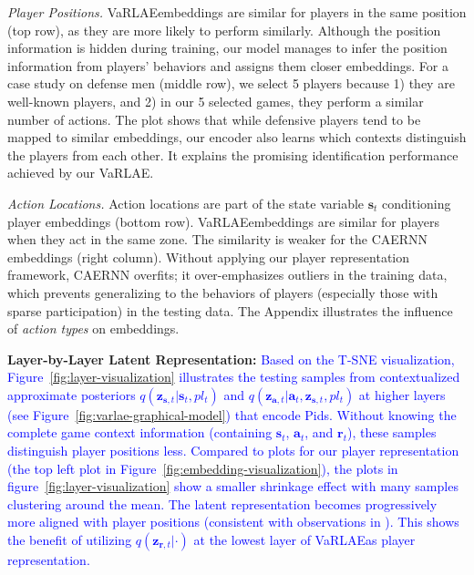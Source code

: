 \documentclass[letterpaper]{article} %
\newcommand{\latentvariables}{\mathbf{z}}
\newcommand{\state}{\mathbf{s}}
\newcommand{\action}{\mathbf{a}}
\newcommand{\reward}{\boldsymbol{r}}
\newcommand{\player}{pl}
\newcommand{\system}{VaRLAE\;}
\begin{document}
{\em Player Positions.} 
\system embeddings are similar for
players in the same position (top row), as they are more likely to perform similarly. Although the position information is hidden during training, our model manages to infer the position information from players' behaviors and assigns them closer embeddings.
For a case study on  defense men (middle row), we select 5 players because 1) they are well-known players, and 2) in our 5 selected games, they perform a similar number of actions.
The plot shows that while defensive players tend to be mapped to similar embeddings, our encoder also learns which contexts distinguish the players from each other. It explains the promising identification performance achieved by our \system.

{\em Action Locations.} 
Action locations are part of the state variable $\state_{t}$ conditioning player embeddings (bottom row). 
\system embeddings are similar for players when they act in the same zone. 
The similarity is 
weaker for the CAERNN embeddings (right column). Without 
applying our player representation framework, CAERNN overfits;
it over-emphasizes %
outliers in the training data, which prevents generalizing to the behaviors of players (especially those with sparse participation) in the testing data.   
The Appendix illustrates the influence of {\em action types} on embeddings.

{\bf Layer-by-Layer Latent Representation:}
\textcolor{blue}{Based on the T-SNE visualization, Figure~\ref{fig:layer-visualization} illustrates the testing samples from contextualized approximate posteriors $q(\latentvariables_{\state,t}|\state_{t},\player_{t})$ and $q(\latentvariables_{\action,t}|\action_{t},\latentvariables_{\state,t}, \player_{t})$ at higher layers (see Figure~\ref{fig:varlae-graphical-model}) that encode Pids. 
Without knowing the complete game context information (containing $\state_{t}$, $\action_{t}$, and $\reward_{t}$), these samples distinguish player positions less. Compared to plots for our player representation (the top left plot in Figure~\ref{fig:embedding-visualization}), the plots in figure~\ref{fig:layer-visualization} show a smaller shrinkage effect with many samples clustering around the mean. The latent representation becomes progressively more aligned with player positions 
(consistent with observations in \cite{SonderbyLadderVAE16}). This shows the benefit of utilizing $q(\latentvariables_{\reward,t}|\cdot)$ at the lowest layer of \system as player representation.}
\end{document}
